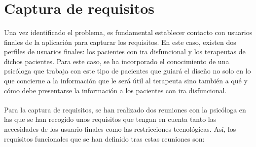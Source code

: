 \section{Captura de requisitos}
\label{sec:c4:cap}
\paragraph{}
Una vez identificado el problema, es fundamental establecer contacto con usuarios finales de la aplicación para capturar los requisitos. En este caso, existen dos perfiles de usuarios finales: los pacientes con ira disfuncional y los terapeutas de dichos pacientes. Para este caso, se ha incorporado el conocimiento de una psicóloga que trabaja con este tipo de pacientes que guiará el diseño no solo en lo que concierne a la información que le será útil al terapeuta sino también a qué y cómo debe presentarse la información a los pacientes con ira disfuncional.

\paragraph{}
Para la captura de requisitos, se han realizado dos reuniones con la psicóloga en las que se han recogido unos requisitos que tengan en cuenta tanto las necesidades de los usuario finales como las restricciones tecnológicas. Así, los requisitos funcionales que se han definido tras estas reuniones son:

